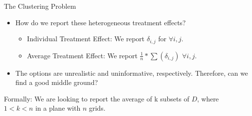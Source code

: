 \begin{frame}{The Clustering Problem}

\begin{itemize}
    \item How do we report these heterogeneous treatment effects?
    \vspace{-7pt}
\begin{itemize}
    \item Individual Treatment Effect: We report $\delta_{i,j}$ for $\forall i,j$.
    \item Average Treatment Effect: We report $\frac{1}{n}*\sum(\delta_{i,j})$ $\forall i,j$. 
\end{itemize}
    \vspace{-7pt}
    \item The options are unrealistic and uninformative, respectively. Therefore, can we find a good middle ground?
\end{itemize}

\begin{center}
    Formally: We are looking to report the average of k subsets of $D$, where $1 < k < n$ in a plane with $n$ grids. 
\end{center}
\end{frame}

